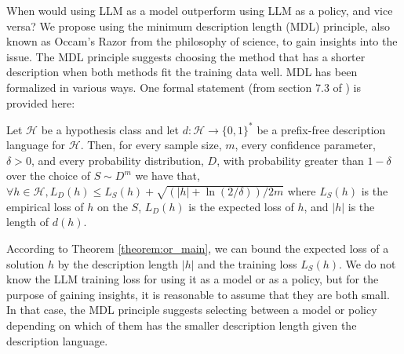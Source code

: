 {


When would using LLM as a model outperform using LLM as a policy, and vice versa? We propose using the minimum description length (MDL) principle, also known as Occam's Razor from the philosophy of science, to gain insights into the issue. The MDL principle suggests choosing the method that has a shorter description when both methods fit the training data well. MDL has been formalized in various ways. One formal statement (from section 7.3 of \cite{shalev2014understanding}) is provided here:
\begin{theorem}
Let $\mathcal{H}$ be a hypothesis class and let $d:\mathcal{H} \rightarrow \{0, 1\}^*$ be a prefix-free description language for $\mathcal{H}$. Then, for every sample size, $m$, every confidence parameter, $\delta > 0$, and every probability distribution, $D$, with probability greater than $1-\delta$ over the choice of $S\sim D^m$ we have that,
$ \forall h\in\mathcal{H}, L_D(h)\leq L_S(h)+\sqrt{(|h|+\ln{(2/\delta)})/2m}
$
where $L_S(h)$ is the empirical loss of $h$ on the $S$, $L_D(h)$ is the expected loss of $h$, and $|h|$ is the length of $d(h)$.
\vspace{-4pt}
\label{theorem:or_main}
\end{theorem}
According to Theorem \ref{theorem:or_main}, we can bound the expected loss of a solution $h$ by the description length $|h|$ and the training loss $L_S(h)$. We do not know the LLM training loss for using it as a model or as a policy, but for the purpose of gaining insights, it is reasonable to assume that they are both small. In that case, the MDL principle suggests selecting between a model or policy depending on which of them has the smaller description length given the description language.

}
